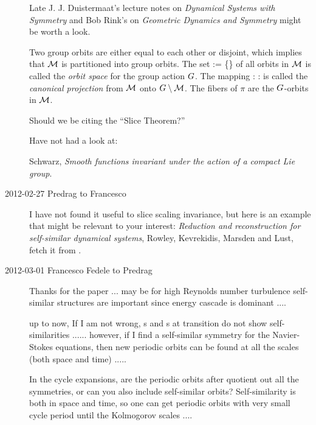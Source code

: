 \begin{description}
Late J. J. Duistermaat's
{lecture notes} on \emph{Dynamical Systems with Symmetry} and Bob Rink's
 on
\emph{Geometric Dynamics and Symmetry} might be worth a look.

                                    \toCB
Two group orbits are either equal to each other or disjoint, which
implies that ${\cal M}$ is partitioned into group orbits. The set
\beq
\Group\setminus\pS := \left\{\Group \xInit \mid \xInit \in \pS \right\}
of all orbits in ${\cal M}$ is called the \emph{orbit space} for the group
action $G$. The mapping
\beq
\pi : \xInit \mapsto \Group \xInit : \pS \to \Group\setminus\pS
{}
is called the \emph{canonical projection} from ${\cal M}$ onto
$G\setminus{\cal M}$. The fibers of $\pi$ are the $G$-orbits in
${\cal M}$.

Should we be citing the ``Slice Theorem?''

Have not had a look at:

Schwarz,
\emph{Smooth functions invariant under the action of a compact {Lie} group}.

\item[2012-02-27 Predrag to Francesco]
I have not found it useful to slice scaling invariance, but here is an
example that might be relevant to your interest: \emph{Reduction and
reconstruction for self-similar dynamical systems}, Rowley, Kevrekidis,
Marsden and Lust, fetch it from
.

\item[2012-03-01 Francesco Fedele to Predrag]

Thanks for the paper ... may be for high Reynolds number turbulence
self-similar structures are important since energy cascade is dominant
....

up to now, If I am not wrong, \rpo s and \po s at transition
do not show self-similarities ...... however, if I find a
self-similar symmetry for the Navier-Stokes equations, then new
periodic orbits can be found at all the scales (both space and time)
.....

In the cycle expansions, are the periodic orbits after quotient out
all the symmetries, or can you also include self-similar orbits?
Self-similarity is both in space and time, so one can get periodic
orbits with very small cycle period until the Kolmogorov scales ....


\end{description}
